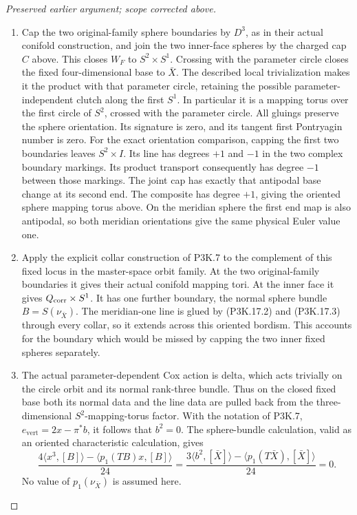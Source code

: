 \begin{proof}[Preserved earlier argument; scope corrected above]
\begin{enumerate}[label=\arabic*.]
\item Cap the two original-family sphere boundaries by \(D^3\),
as in their actual conifold construction, and join the two
inner-face spheres by the charged cap \(C\) above.  This
closes \(W_F\) to \(S^2\times S^1\).  Crossing with
the parameter circle closes the fixed four-dimensional base
to \(\bar X\).  The described local trivialization makes
it the product with that parameter circle, retaining the
possible parameter-independent clutch along the first
\(S^1\).  In particular it is a mapping torus over the
first circle of \(S^2\), crossed with the parameter circle.
All gluings preserve the sphere orientation.  Its signature
is zero, and its tangent first Pontryagin number is zero.
For the exact orientation comparison, capping the first two
boundaries leaves \(S^2\times I\).  Its line has degrees
\(+1\) and \(-1\) in the two complex boundary markings.
Its product transport consequently has degree \(-1\)
between those markings.  The joint cap has exactly that
antipodal base change at its second end.  The composite has
degree \(+1\), giving the oriented sphere mapping torus
above.  On the meridian sphere the first end map is also
antipodal, so both meridian orientations give the same
physical Euler value one.

\item Apply the explicit collar construction of P3K.7 to the
complement of this fixed locus in the master-space orbit
family.  At the two original-family boundaries it gives
their actual conifold mapping tori.  At the inner face it
gives \(Q_{\rm corr}\times S^1\).  It has one further
boundary, the normal sphere bundle \(B=S(\nu_{\bar X})\).
The meridian-one line is glued by (P3K.17.2) and (P3K.17.3)
through every collar, so it extends across this oriented
bordism.  This accounts for the boundary which would be
missed by capping the two inner fixed spheres separately.

\item The actual parameter-dependent Cox action is delta, which
acts trivially on the circle orbit and its normal rank-three
bundle.  Thus on the closed fixed base both its normal data
and the line data are pulled back from the three-dimensional
\(S^2\)-mapping-torus factor.  With the notation of P3K.7,
\(e_{\mathrm{vert}}=2x-\pi^*b\), it follows that
\(b^2=0\).  The sphere-bundle calculation, valid as an
oriented characteristic calculation, gives
\[
       \frac{4\langle x^3,[B]\rangle
                  -\langle p_1(TB)x,[B]\rangle}{24}
       =\frac{3\langle b^2,[\bar X]\rangle
                    -\langle p_1(T\bar X),[\bar X]\rangle}{24}
       =0.                                             \tag{P3K.17.5}
\]
No value of \(p_1(\nu_{\bar X})\) is assumed here.


\end{enumerate}
\end{proof}
